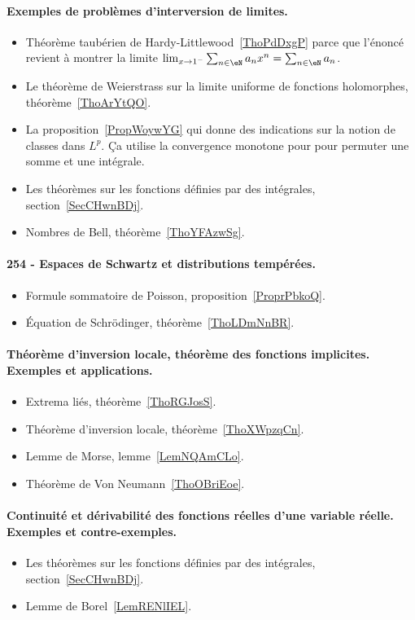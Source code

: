 \paragraph{Exemples de problèmes d’interversion de limites.}
\begin{itemize}
    \item Théorème taubérien de Hardy-Littlewood~\ref{ThoPdDxgP} parce que l'énoncé revient à montrer la limite \( \lim_{x\to 1^-} \sum_{n\in \eN}a_nx^n=\sum_{n\in \eN}a_n\).
    \item Le théorème de Weierstrass sur la limite uniforme de fonctions holomorphes, théorème~\ref{ThoArYtQO}.
    \item La proposition~\ref{PropWoywYG} qui donne des indications sur la notion de classes dans \( L^p\). Ça utilise la convergence monotone pour  pour permuter une somme et une intégrale.
    \item Les théorèmes sur les fonctions définies par des intégrales, section~\ref{SecCHwnBDj}.
    \item Nombres de Bell, théorème~\ref{ThoYFAzwSg}.
\end{itemize}
\paragraph{254 - Espaces de Schwartz et distributions tempérées.}
\begin{itemize}
    \item Formule sommatoire de Poisson, proposition~\ref{ProprPbkoQ}.
    \item Équation de Schrödinger, théorème~\ref{ThoLDmNnBR}.
\end{itemize}

\paragraph{Théorème d’inversion locale, théorème des fonctions implicites. Exemples et applications.}
\begin{itemize}
    \item Extrema liés, théorème~\ref{ThoRGJosS}.
    \item Théorème d'inversion locale, théorème~\ref{ThoXWpzqCn}.
    \item Lemme de Morse, lemme~\ref{LemNQAmCLo}.
    \item Théorème de Von Neumann~\ref{ThoOBriEoe}.
\end{itemize}
\paragraph{Continuité et dérivabilité des fonctions réelles d'une variable réelle. Exemples et contre-exemples.}
\begin{itemize}
    \item Les théorèmes sur les fonctions définies par des intégrales, section~\ref{SecCHwnBDj}.
    \item Lemme de Borel~\ref{LemRENlIEL}.
\end{itemize}
